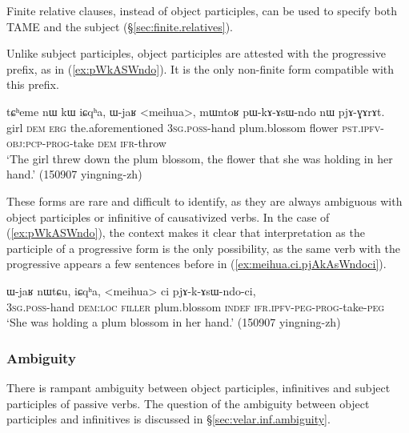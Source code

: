 Finite relative clauses, instead of object participles, can be used to specify both TAME and the subject (§\ref{sec:finite.relatives}).

Unlike subject participles, object participles are attested with the progressive  prefix, as in (\ref{ex:pWkASWndo}). It is the only non-finite form compatible with this prefix.  

\begin{exe}
\ex  \label{ex:pWkASWndo}
\gll  tɕʰeme nɯ kɯ iɕqʰa, ɯ-jaʁ <meihua>, mɯntoʁ pɯ-kɤ-ɤsɯ-ndo nɯ pjɤ-ɣɤrɤt.  \\
girl \textsc{dem} \textsc{erg} the.aforementioned \textsc{3sg}.\textsc{poss}-hand plum.blossom flower \textsc{pst}.\textsc{ipfv}-\textsc{obj}:\textsc{pcp}-\textsc{prog}-take \textsc{dem} \textsc{ifr}-throw \\
\glt `The girl threw down the plum blossom, the flower that she was holding in her hand.' (150907 yingning-zh)
\end{exe}

These forms are rare and difficult to identify, as they are always ambiguous with object participles or infinitive of causativized verbs. In the case of (\ref{ex:pWkASWndo}), the context makes it clear that interpretation as the participle of a progressive form is the only possibility, as the same verb with the progressive appears a few sentences before in (\ref{ex:meihua.ci.pjAkAsWndoci}).

\begin{exe}
\ex  \label{ex:meihua.ci.pjAkAsWndoci}
\gll   ɯ-jaʁ nɯtɕu, iɕqʰa, <meihua> ci pjɤ-k-ɤsɯ-ndo-ci, \\
\textsc{3sg}.\textsc{poss}-hand \textsc{dem}:\textsc{loc} \textsc{filler} plum.blossom \textsc{indef} \textsc{ifr}.\textsc{ipfv}-\textsc{peg}-\textsc{prog}-take-\textsc{peg} \\
 \glt `She was holding a plum blossom in her hand.' (150907 yingning-zh) 
\end{exe}

\subsubsection{Ambiguity} \label{sec:object.participle.ambiguity}
There is rampant ambiguity between object participles,  infinitives and subject participles of passive verbs.  The question of the ambiguity between object participles and  infinitives is discussed in §\ref{sec:velar.inf.ambiguity}.

